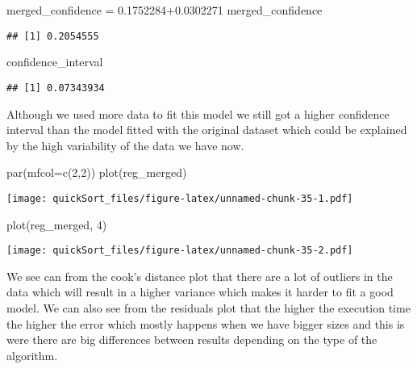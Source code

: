 \documentclass[
]{article}
\newenvironment{Shaded}{\begin{snugshade}}{\end{snugshade}}
\newcommand{\AttributeTok}[1]{\textcolor[rgb]{0.77,0.63,0.00}{#1}}
\newcommand{\DecValTok}[1]{\textcolor[rgb]{0.00,0.00,0.81}{#1}}
\newcommand{\FloatTok}[1]{\textcolor[rgb]{0.00,0.00,0.81}{#1}}
\newcommand{\FunctionTok}[1]{\textcolor[rgb]{0.00,0.00,0.00}{#1}}
\newcommand{\NormalTok}[1]{#1}
\newcommand{\OtherTok}[1]{\textcolor[rgb]{0.56,0.35,0.01}{#1}}
\begin{document}
\begin{Shaded}
\begin{Highlighting}[]
\NormalTok{merged\_confidence }\OtherTok{=} \FloatTok{0.1752284+0.0302271}
\NormalTok{merged\_confidence}
\end{Highlighting}
\end{Shaded}

\begin{verbatim}
## [1] 0.2054555
\end{verbatim}

\begin{Shaded}
\begin{Highlighting}[]
\NormalTok{confidence\_interval}
\end{Highlighting}
\end{Shaded}

\begin{verbatim}
## [1] 0.07343934
\end{verbatim}

Although we used more data to fit this model we still got a higher
confidence interval than the model fitted with the original dataset
which could be explained by the high variability of the data we have
now.

\begin{Shaded}
\begin{Highlighting}[]
\FunctionTok{par}\NormalTok{(}\AttributeTok{mfcol=}\FunctionTok{c}\NormalTok{(}\DecValTok{2}\NormalTok{,}\DecValTok{2}\NormalTok{))}
\FunctionTok{plot}\NormalTok{(reg\_merged)}
\end{Highlighting}
\end{Shaded}

\texttt{[image: quickSort\_files/figure-latex/unnamed-chunk-35-1.pdf]}

\begin{Shaded}
\begin{Highlighting}[]
\FunctionTok{plot}\NormalTok{(reg\_merged, }\DecValTok{4}\NormalTok{)}
\end{Highlighting}
\end{Shaded}

\texttt{[image: quickSort\_files/figure-latex/unnamed-chunk-35-2.pdf]}

We see can from the cook's distance plot that there are a lot of
outliers in the data which will result in a higher variance which makes
it harder to fit a good model. We can also see from the residuals plot
that the higher the execution time the higher the error which mostly
happens when we have bigger sizes and this is were there are big
differences between results depending on the type of the algorithm.
\end{document}
